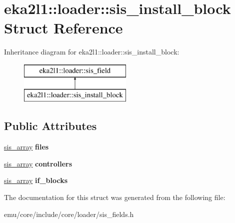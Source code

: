 \hypertarget{structeka2l1_1_1loader_1_1sis__install__block}{}\section{eka2l1\+:\+:loader\+:\+:sis\+\_\+install\+\_\+block Struct Reference}
\label{structeka2l1_1_1loader_1_1sis__install__block}
Inheritance diagram for eka2l1\+:\+:loader\+:\+:sis\+\_\+install\+\_\+block\+:\begin{figure}[H]
\begin{center}
\leavevmode
\includegraphics[height=2.000000cm]{structeka2l1_1_1loader_1_1sis__install__block}
\end{center}
\end{figure}
\subsection*{Public Attributes}
\begin{DoxyCompactItemize}
\item 
\mbox{\label{structeka2l1_1_1loader_1_1sis__install__block_adb70f8377ab53bdda9c3948381dde132}} 
\mbox{\hyperlink{structeka2l1_1_1loader_1_1sis__array}{sis\+\_\+array}} {\bfseries files}
\item 
\mbox{\label{structeka2l1_1_1loader_1_1sis__install__block_adc289194f1d5dc718326bec1154cef76}} 
\mbox{\hyperlink{structeka2l1_1_1loader_1_1sis__array}{sis\+\_\+array}} {\bfseries controllers}
\item 
\mbox{\label{structeka2l1_1_1loader_1_1sis__install__block_aa25c6d48d8f282f5abb01e878dff928b}} 
\mbox{\hyperlink{structeka2l1_1_1loader_1_1sis__array}{sis\+\_\+array}} {\bfseries if\+\_\+blocks}
\end{DoxyCompactItemize}


The documentation for this struct was generated from the following file\+:\begin{DoxyCompactItemize}
\item 
emu/core/include/core/loader/sis\+\_\+fields.\+h\end{DoxyCompactItemize}
